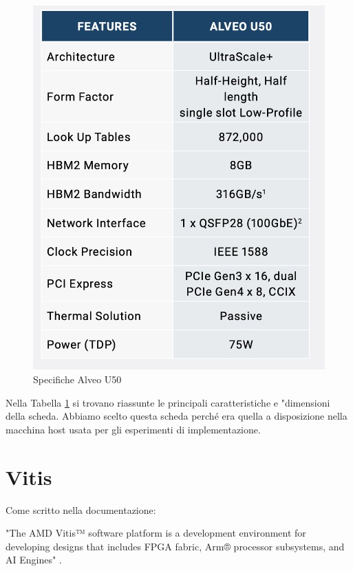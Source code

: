 \begin{figure}[h!]
    \centering
    \includegraphics[scale=0.3]{images/Capitolo2/3_im.png}
    \caption{Specifiche Alveo U50 \cite{sitoAlveoU50}}
    \label{Specifiche-U50}
\end{figure}

Nella Tabella \ref{Specifiche-U50} si trovano riassunte le principali caratteristiche e "dimensioni della scheda.
Abbiamo scelto questa scheda perché era quella a disposizione nella macchina host usata per gli esperimenti di implementazione.
\vspace{0,3cm}

\section{Vitis}
\label{Vitis}
Come scritto nella documentazione:

\vspace{0,2cm}

"The AMD Vitis™ software platform is a development environment for developing designs that includes FPGA fabric, Arm® processor subsystems, and AI Engines" \cite{sitoAMDvitis}. 

